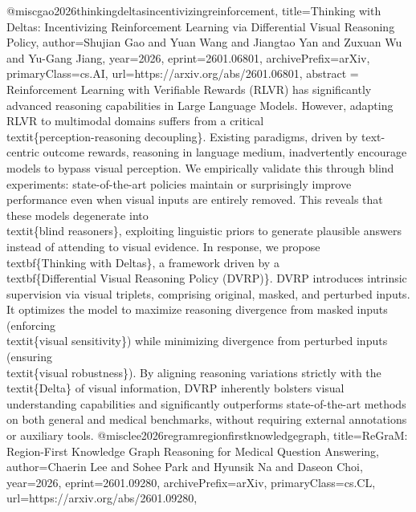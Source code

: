 {}@misc{gao2026thinkingdeltasincentivizingreinforcement,
      title={Thinking with Deltas: Incentivizing Reinforcement Learning via Differential Visual Reasoning Policy}, 
      author={Shujian Gao and Yuan Wang and Jiangtao Yan and Zuxuan Wu and Yu-Gang Jiang},
      year={2026},
      eprint={2601.06801},
      archivePrefix={arXiv},
      primaryClass={cs.AI},
      url={https://arxiv.org/abs/2601.06801},
      abstract = {Reinforcement Learning with Verifiable Rewards (RLVR) has significantly advanced reasoning capabilities in Large Language Models. However, adapting RLVR to multimodal domains suffers from a critical \\textit\{perception-reasoning decoupling\}. Existing paradigms, driven by text-centric outcome rewards, reasoning in language medium, inadvertently encourage models to bypass visual perception. We empirically validate this through blind experiments: state-of-the-art policies maintain or surprisingly improve performance even when visual inputs are entirely removed. This reveals that these models degenerate into \\textit\{blind reasoners\}, exploiting linguistic priors to generate plausible answers instead of attending to visual evidence. In response, we propose \\textbf\{Thinking with Deltas\}, a framework driven by a \\textbf\{Differential Visual Reasoning Policy (DVRP)\}. DVRP introduces intrinsic supervision via visual triplets, comprising original, masked, and perturbed inputs. It optimizes the model to maximize reasoning divergence from masked inputs (enforcing \\textit\{visual sensitivity\}) while minimizing divergence from perturbed inputs (ensuring \\textit\{visual robustness\}). By aligning reasoning variations strictly with the \\textit\{Delta\} of visual information, DVRP inherently bolsters visual understanding capabilities and significantly outperforms state-of-the-art methods on both general and medical benchmarks, without requiring external annotations or auxiliary tools.}
}@misc{lee2026regramregionfirstknowledgegraph,
      title={ReGraM: Region-First Knowledge Graph Reasoning for Medical Question Answering}, 
      author={Chaerin Lee and Sohee Park and Hyunsik Na and Daseon Choi},
      year={2026},
      eprint={2601.09280},
      archivePrefix={arXiv},
      primaryClass={cs.CL},
      url={https://arxiv.org/abs/2601.09280},
}
